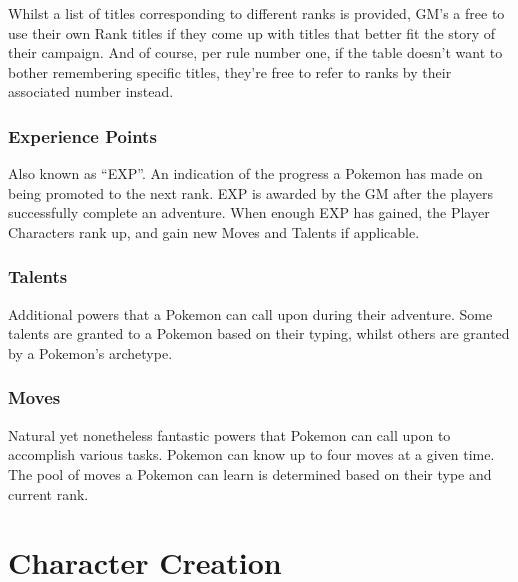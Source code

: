 \documentclass[
  11pt,
  letterpaper,
]{scrbook}
\begin{document}
\begin{tcolorbox}[enhanced jigsaw, toptitle=1mm, leftrule=.75mm, bottomrule=.15mm, colbacktitle=quarto-callout-note-color!10!white, opacitybacktitle=0.6, toprule=.15mm, colframe=quarto-callout-note-color-frame, breakable, rightrule=.15mm, titlerule=0mm, left=2mm, coltitle=black, title=\textcolor{quarto-callout-note-color}{\faInfo}\hspace{0.5em}{Note}, bottomtitle=1mm, opacityback=0, arc=.35mm, colback=white]

Whilst a list of titles corresponding to different ranks is provided,
GM's a free to use their own Rank titles if they come up with titles
that better fit the story of their campaign. And of course, per rule
number one, if the table doesn't want to bother remembering specific
titles, they're free to refer to ranks by their associated number
instead.

\end{tcolorbox}

\subsection{Experience Points}\label{experience-points}

Also known as ``EXP''. An indication of the progress a Pokemon has made
on being promoted to the next rank. EXP is awarded by the GM after the
players successfully complete an adventure. When enough EXP has gained,
the Player Characters rank up, and gain new Moves and Talents if
applicable.

\subsection{Talents}\label{talents}

Additional powers that a Pokemon can call upon during their adventure.
Some talents are granted to a Pokemon based on their typing, whilst
others are granted by a Pokemon's archetype.

\subsection{Moves}\label{moves}

Natural yet nonetheless fantastic powers that Pokemon can call upon to
accomplish various tasks. Pokemon can know up to four moves at a given
time. The pool of moves a Pokemon can learn is determined based on their
type and current rank.

\chapter{Character Creation}\label{character-creation}
\end{document}
